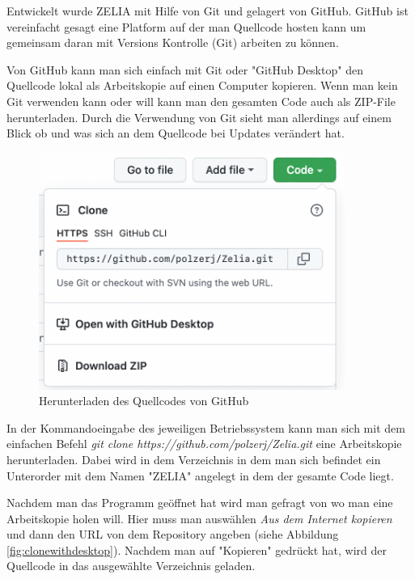 
Entwickelt wurde ZELIA mit Hilfe von Git und gelagert von GitHub. GitHub ist vereinfacht gesagt eine Platform auf der man Quellcode hosten kann um gemeinsam daran mit Versions Kontrolle (Git) arbeiten zu können. 

Von GitHub kann man sich einfach mit Git oder "GitHub Desktop" den Quellcode lokal als Arbeitskopie auf einen Computer kopieren. Wenn man kein Git verwenden kann oder will kann man den gesamten Code auch als ZIP-File herunterladen. Durch die Verwendung von Git sieht man allerdings auf einem Blick ob und was sich an dem Quellcode bei Updates verändert hat.

\begin{figure}[H]
    \centering
    \includegraphics[width=100mm]{media/Handbuch/GitHub_Download.png}
    \caption{Herunterladen des Quellcodes von GitHub}
\end{figure}


In der Kommandoeingabe des jeweiligen Betriebssystem kann man sich mit dem einfachen Befehl \emph{git clone https://github.com/polzerj/Zelia.git} eine Arbeitskopie herunterladen. Dabei wird in dem Verzeichnis in dem man sich befindet ein Unterorder mit dem Namen "ZELIA" angelegt in dem der gesamte Code liegt.


Nachdem man das Programm geöffnet hat wird man gefragt von wo man eine Arbeitskopie holen will. Hier muss man auswählen \emph{Aus dem Internet kopieren} und dann den URL von dem Repository angeben (siehe Abbildung \ref{fig:clonewithdesktop}). Nachdem man auf "Kopieren" gedrückt hat, wird der Quellcode in das ausgewählte Verzeichnis geladen. 

